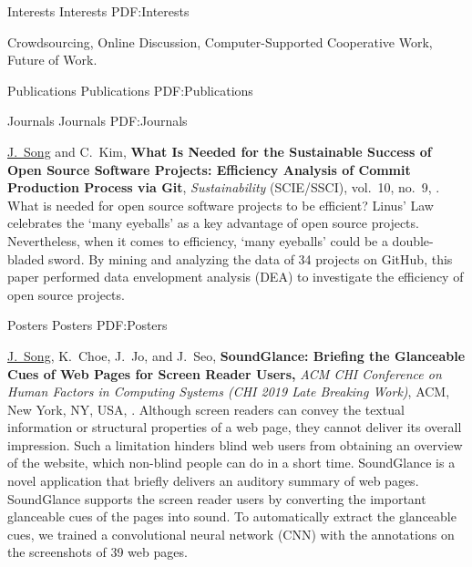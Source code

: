\documentclass[letterpaper,MMMyyyy,nonstopmode]{template}
\begin{document}
\begin{Body}
\begin{Detail}
\end{Detail}

    
\BigGap
\Section
{Interests}
{Interests}
{PDF:Interests}

\Entry
Crowdsourcing,
Online Discussion,
Computer-Supported Cooperative Work,
Future of Work.


\BigGap
\Section
{Publications}
{Publications}
{PDF:Publications}

\SubSection
{Journals}
{Journals}
{PDF:Journals}

\begingroup
\renewcommand{\MaxNumberedItem}{[88]}

\BigGap
\NumberedItem{[1]}
  \href{https://doi.org/10.3390/su10093001}
  \underline{J.~Song} and C.~Kim,
  \textbf{What Is Needed for the Sustainable Success of Open Source Software Projects: Efficiency Analysis of Commit Production Process via Git},
  \textit{Sustainability} (SCIE/SSCI),
  vol.~10,
  no.~9,
  .
  \vspace{2mm}\newline
  {\small{
    What is needed for open source software projects to be efficient? Linus' Law celebrates the `many eyeballs' as a key advantage of open source projects. 
    Nevertheless, when it comes to efficiency, `many eyeballs' could be a double-bladed sword. By mining and analyzing the data of 34 projects on GitHub, this paper performed data envelopment analysis (DEA) to investigate the efficiency of open source projects.
  }}

\endgroup

\BigGap
\SubSection
{Posters}
{Posters}
{PDF:Posters}

\begingroup
\renewcommand{\MaxNumberedItem}{[88]}

\BigGap
\NumberedItem{[2]}
  \href{https://doi.org/10.1145/3290607.3312865}
  \underline{J.~Song}, K.~Choe, J.~Jo, and J.~Seo,
  \textbf{SoundGlance: Briefing the Glanceable Cues of Web Pages for Screen Reader Users,}
  \textit{ACM CHI Conference on Human Factors in Computing Systems (CHI 2019 Late Breaking Work)},
  ACM, New York, NY, USA,
  .
  \vspace{2mm}\newline
  {\small{
    Although screen readers can convey the textual information or structural properties of a web page, they cannot deliver its overall impression. Such a limitation hinders blind web users from obtaining an overview of the website, which non-blind people can do in a short time. 
    SoundGlance is a novel application that briefly delivers an auditory summary of web pages. SoundGlance supports the screen reader users by converting the important glanceable cues of the pages into sound.
    To automatically extract the glanceable cues, we trained a convolutional neural network (CNN) with the annotations on the screenshots of 39 web pages.
  }}


\end{Body}
\end{document}
